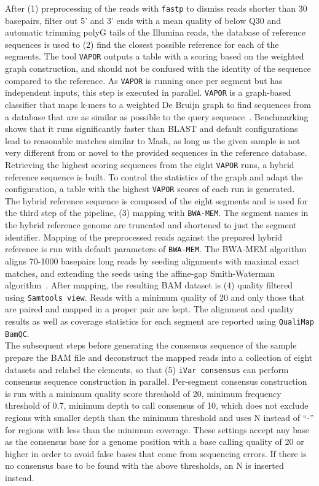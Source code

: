 After (1) preprocessing of the reads with \texttt{fastp} to dismiss reads shorter than 30 basepairs, filter out 5' and 3' ends with a mean quality of below Q30 and automatic trimming polyG tails of the Illumina reads, the database of reference sequences is used to (2) find the closest possible reference for each of the segments. The tool \texttt{VAPOR} outputs a table with a scoring based on the weighted graph construction, and should not be confused with the identity of the sequence compared to the reference. As \texttt{VAPOR} is running once per segment but has independent inputs, this step is executed in parallel. \texttt{VAPOR} is a graph-based classifier that maps k-mers to a weighted De Bruijn graph to find sequences from a database that are as similar as possible to the query sequence~\cite{southgate2020influenza}. Benchmarking shows that it runs significantly faster than \ac{BLAST} and default configurations lead to reasonable matches similar to Mash, as long as the given sample is not very different from or novel to the provided sequences in the reference database. \\
Retrieving the highest scoring sequences from the eight \texttt{VAPOR} runs, a hybrid reference sequence is built. To control the statistics of the graph and adapt the configuration, a table with the highest \texttt{VAPOR} scores of each run is generated. \\
The hybrid reference sequence is composed of the eight segments and is used for the third step of the pipeline, (3) mapping with \texttt{BWA-MEM}. The segment names in the hybrid reference genome are truncated and shortened to just the segment identifier. Mapping of the preprocessed reads against the prepared hybrid reference is run with default parameters of \texttt{BWA-MEM}. The \ac{BWA-MEM} algorithm aligns 70-1000 basepairs long reads by seeding alignments with maximal exact matches, and extending the seeds using the affine-gap Smith-Waterman algorithm~\cite{li2013aligning}. After mapping, the resulting \ac{BAM} dataset is (4) quality filtered using \texttt{Samtools view}. Reads with a minimum quality of 20 and only those that are paired and mapped in a proper pair are kept. The alignment and quality results as well as coverage statistics for each segment are reported using \texttt{QualiMap BamQC}. \\
The subsequent steps before generating the consensus sequence of the sample prepare the \ac{BAM} file and deconstruct the mapped reads into a collection of eight datasets and relabel the elements, so that (5) \texttt{iVar consensus} can perform consensus sequence construction in parallel. Per-segment consensus construction is run with a minimum quality score threshold of 20, minimum frequency threshold of 0.7, minimum depth to call consensus of 10, which does not exclude regions with smaller depth than the minimum threshold and uses N instead of ``-'' for regions with less than the minimum coverage. These settings accept any base as the consensus base for a genome position with a base calling quality of 20 or higher in order to avoid false bases that come from sequencing errors. If there is no consensus base to be found with the above thresholds, an N is inserted instead. \\

